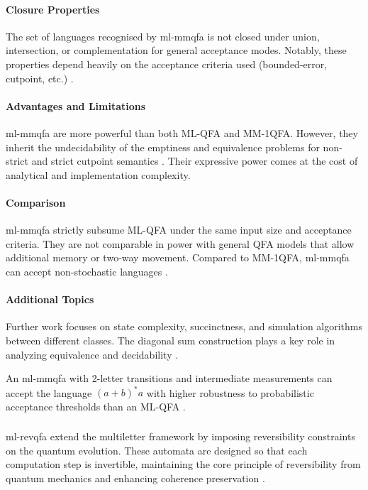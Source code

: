 \paragraph{Closure Properties}
The set of languages recognised by \gls{ml-mmqfa} is not closed under union, intersection, or complementation for general acceptance modes. Notably, these properties depend heavily on the acceptance criteria used (bounded-error, cutpoint, etc.) \cite{qiu2009hierarchy}.

\paragraph{Advantages and Limitations}
\gls{ml-mmqfa} are more powerful than both ML-QFA and MM-1QFA. However, they inherit the undecidability of the emptiness and equivalence problems for non-strict and strict cutpoint semantics \cite{qiu2008decidability, lin2012equivalence}. Their expressive power comes at the cost of analytical and implementation complexity.

\paragraph{Comparison} 
\gls{ml-mmqfa} strictly subsume ML-QFA under the same input size and acceptance criteria. They are not comparable in power with general QFA models that allow additional memory or two-way movement. Compared to MM-1QFA, \gls{ml-mmqfa} can accept non-stochastic languages \cite{qiu2009hierarchy}.

\paragraph{Additional Topics}
Further work focuses on state complexity, succinctness, and simulation algorithms between different classes. The diagonal sum construction plays a key role in analyzing equivalence and decidability \cite{lin2012equivalence}.

\begin{example}
An \gls{ml-mmqfa} with 2-letter transitions and intermediate measurements can accept the language $(a+b)^*a$ with higher robustness to probabilistic acceptance thresholds than an ML-QFA \cite{belovs2007multi}.
\end{example}


\subsubsection{}
\gls{ml-revqfa} extend the multiletter framework by imposing reversibility constraints on the quantum evolution. These automata are designed so that each computation step is invertible, maintaining the core principle of reversibility from quantum mechanics and enhancing coherence preservation \cite{belovs2007multi}.

